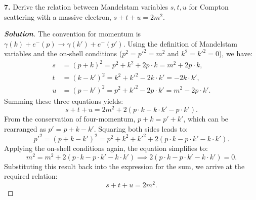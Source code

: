 \documentclass[11pt]{article}
\newenvironment{solution}[1][]{\begin{proof}[\textbf{Solution}]}{\end{proof}}
\begin{document}
\begin{tcolorbox}[problem]
\textbf{7.} Derive the relation between Mandelstam variables $s,t,u$ for Compton scattering with a massive electron, $s+t+u=2m^2$.
\end{tcolorbox}
\begin{solution}[14.7]
	The convention for momentum is $\gamma(k) + e^-(p) \to \gamma(k') + e^-(p')$. Using the definition of Mandelstam variables and the on-shell conditions ($p^2=p'^2=m^2$ and $k^2=k'^2=0$), we have:
	\begin{align*}
		s &= (p + k)^2 = p^2 + k^2 + 2p \cdot k = m^2 + 2p \cdot k, \\
		t &= (k - k')^2 = k^2 + k'^2 - 2k \cdot k' = -2k \cdot k', \\
		u &= (p - k')^2 = p^2 + k'^2 - 2p \cdot k' = m^2 - 2p \cdot k'.
	\end{align*}
	Summing these three equations yields:
	\begin{equation*}
		s + t + u = 2m^2 + 2(p \cdot k - k \cdot k' - p \cdot k').
	\end{equation*}
	From the conservation of four-momentum, $p + k = p' + k'$, which can be rearranged as $p' = p + k - k'$. Squaring both sides leads to:
	\begin{equation*}
		p'^2 = (p + k - k')^2 = p^2 + k^2 + k'^2 + 2(p \cdot k - p \cdot k' - k \cdot k').
	\end{equation*}
	Applying the on-shell conditions again, the equation simplifies to:
	\begin{equation*}
		m^2 = m^2 + 2(p \cdot k - p \cdot k' - k \cdot k') \implies 2(p \cdot k - p \cdot k' - k \cdot k') = 0.
	\end{equation*}
	Substituting this result back into the expression for the sum, we arrive at the required relation:
	\begin{equation*}
		s + t + u = 2m^2.
	\end{equation*}
\end{solution}
\end{document}
